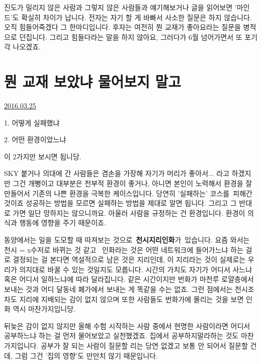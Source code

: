 진도가 밀리지 않은 사람과 그렇지 않은 사람들과 얘기해보거나 글을 읽어보면 '마인드'도 확실히 차이가 납니다.
전자는 자기 할 게 바빠서 사소한 질문은 하지 않습니다. 오직 힘들어죽겠다 그 한마디입니다.
후자는 여전히 뭔 교재가 좋아요라는 질문을 병적으로 던집니다. 그리고 힘들다라는 말을 하지 않아요,
그러다가 6월 넘어가면서 또 포기각 나오겠죠.
\vspace{5mm}









\section{뭔 교재 보았냐 물어보지 말고}
\href{https://www.kockoc.com/Apoc/694072}{2016.03.25}

\vspace{5mm}

\item 1. 어떻게 실패했냐
\item 2. 어떤 환경이었느냐
\vspace{5mm}

이 2가지만 보시면 됩니당.
\vspace{5mm}

SKY 붙거나 의대에 간 사람들은 겸손을 가장해 자기가 머리가 좋아서... 라고 하겠지만 그건 개뻥이고
대부분은 천부적 환경이 좋거나, 아니면 본인이 노력해서 환경을 잘 만들어서 기존의 나쁜 환경을 극복한 케이스입니다.
당연히 '실패하는' 코스를 피해간 것이죠
성공하는 방법을 모르면 실패하는 방법을 제대로 알면 됩니다. 그리고 그 반대로 가면 일단 망하지는 않으니까요.
아울러 사람을 규정하는 건 환경입니다. 환경이 의식과 행동에 영향을 주기 때문이죠.
\vspace{5mm}

동양에서는 일을 도모할 때 따져보는 것으로 \textbf{천시지리인화}가 있습니다.
요즘 와서는 천시 = x수저로 바뀌는 것 같고  인화라는 것은 어떤 네트워크에 들어가느냐 하는 걸로 결정되는 걸 본다면
역설적으로 남은 것은 지리인데, 이 지리라는 것이 실제로는 우리가 의지대로 바꿀 수 있는 것일지도 모릅니다.
시간의 가치도 자기가 어디서 사느냐 혹은 어디서 일하느냐에 따라 달라집니다.
같은 시간이지만 번화가 마천루 로얄층에서 보내는 것과 어디 달동네 폐가에서 보내는 게 똑같을 수는 없죠.
그런 점에서는 천시조차도 지리에 지배되는 감이 없지 않으며 또한 사람들도 번화가에 몰리는 것을 보면 인화 역시 마찬가지입니당.
\vspace{5mm}

뒤늦은 감이 없지 않지만 올해 수험 시작하는 사람 중에서 현명한 사람이라면 어디서 공부하느냐 하는 걸 먼저 물어보았고 실천했겠죠.
집에서 공부하지말라하는 것도 마찬가지입니다. 공부가 잘 되는 사람이 질문할 리는 당연 없겠고
보통 안 되어서 질문할 건데, 그럼 그건 '집의 영향'도 만만치 않기 때문입니다.
\vspace{5mm}






